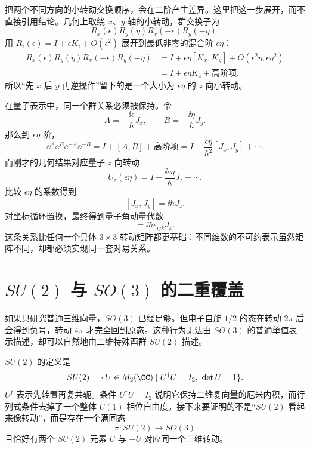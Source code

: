 把两个不同方向的小转动交换顺序，会在二阶产生差异。这里把这一步展开，而不直接引用结论。几何上取绕 $x$、$y$ 轴的小转动，群交换子为
\[
R_x(\epsilon)R_y(\eta)R_x(-\epsilon)R_y(-\eta).
\]
用 $R_i(\epsilon)=I+\epsilon K_i+O(\epsilon^2)$ 展开到最低非零的混合阶 $\epsilon\eta$：
\begin{align*}
R_x(\epsilon)R_y(\eta)R_x(-\epsilon)R_y(-\eta)
&=I+\epsilon\eta[K_x,K_y]
+O(\epsilon^2\eta,\epsilon\eta^2)\\
&=I+\epsilon\eta K_z+\text{高阶项}.
\end{align*}
所以“先 $x$ 后 $y$ 再逆操作”留下的是一个大小为 $\epsilon\eta$ 的 $z$ 向小转动。

在量子表示中，同一个群关系必须被保持。令
\[
A=-\frac{\ii\epsilon}{\hbar}J_x,
\qquad
B=-\frac{\ii\eta}{\hbar}J_y.
\]
那么到 $\epsilon\eta$ 阶，
\[
\ee^A\ee^B\ee^{-A}\ee^{-B}
=I+[A,B]+\text{高阶项}
=I-\frac{\epsilon\eta}{\hbar^2}[J_x,J_y]+\cdots.
\]
而刚才的几何结果对应量子 $z$ 向转动
\[
U_z(\epsilon\eta)
=I-\frac{\ii\epsilon\eta}{\hbar}J_z+\cdots.
\]
比较 $\epsilon\eta$ 的系数得到
\[
[J_x,J_y]=\ii\hbar J_z.
\]
对坐标循环置换，最终得到量子角动量代数
\begin{equation}
[J_i,J_j]=\ii\hbar\epsilon_{ijk}J_k.
\label{eq:angular-momentum-algebra}
\end{equation}
这条关系比任何一个具体 $3\times3$ 转动矩阵都更基础：不同维数的不可约表示虽然矩阵不同，却都必须实现同一套对易关系。

\section{\texorpdfstring{$SU(2)$ 与 $SO(3)$}{SU(2) 与 SO(3)} 的二重覆盖}
\label{sec:su2-double-cover}

如果只研究普通三维向量，$SO(3)$ 已经足够。但电子自旋 $1/2$ 的态在转动 $2\pi$ 后会得到负号，转动 $4\pi$ 才完全回到原态。这种行为无法由 $SO(3)$ 的普通单值表示描述，却可以自然地由二维特殊酉群 $SU(2)$ 描述。

$SU(2)$ 的定义是
\[
SU(2)=\{U\in M_2(\CC)\mid U^\dagger U=I_2,\ \det U=1\}.
\]
$U^\dagger$ 表示先转置再复共轭。条件 $U^\dagger U=I_2$ 说明它保持二维复向量的厄米内积，而行列式条件去掉了一个整体 $U(1)$ 相位自由度。接下来要证明的不是“$SU(2)$ 看起来像转动”，而是存在一个满同态
\[
\pi:SU(2)\to SO(3)
\]
且恰好有两个 $SU(2)$ 元素 $U$ 与 $-U$ 对应同一个三维转动。

